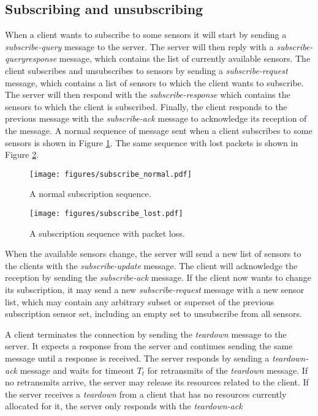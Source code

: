 \documentclass[a4paper]{article}
\begin{document}
\subsection{Subscribing and unsubscribing}
When a client wants to subscribe to some sensors it will start by sending a 
\emph{subscribe-query} message to the server. The server will then reply with
a \emph{subscribe-queryresponse} message, which contains the list of currently
available sensors. The client subscribes and unsubscribes to sensors by sending a 
\emph{subscribe-request} message, which contains a list of sensors to which 
the client wants to subscribe. The server will then respond with the
\emph{subscribe-response} which contains the sensors to which the client is
subscribed. Finally, the client responds to the previous message with the 
\emph{subscribe-ack} message to acknowledge its reception of the message.
A normal sequence of message sent when a client subscribes to some sensors
is shown in Figure \ref{fig:sub_normal}. The same sequence with lost packets 
is shown in Figure \ref{fig:sub_lost}.

\begin{figure}[h]
	\centering
    \texttt{[image: figures/subscribe\_normal.pdf]}
    \caption{A normal subscription sequence.}
    \label{fig:sub_normal}
\end{figure}

\begin{figure}[h]
	\centering
    \texttt{[image: figures/subscribe\_lost.pdf]}
    \caption{A subscription sequence with packet loss.}
    \label{fig:sub_lost}
\end{figure}

\newpage

When the available sensors change, the server will send a new list of sensors
to the clients with the \emph{subscribe-update} message. The client will
acknowledge the reception by sending the \emph{subscribe-ack} message. If the
client now wants to change its subscription, it may send a new 
\emph{subscribe-request} message with a new sensor list, which may contain any arbitrary subset or superset of the previous subscription sensor set, including an empty set to unsubscribe from all sensors.

A client terminates the connection by sending the \emph{teardown} message to the
server. It expects a response from the server and continues sending the same
message until a response is received. The server responds by sending a
\emph{teardown-ack} message and waits for timeout $T_t$ for retransmits of the \emph{teardown} message. If no retransmits arrive, the server may release its resources
related to the client. If the server receives a \emph{teardown} from a client that has no resources currently allocated for it, the server only responds with the \emph{teardown-ack}
\end{document}
